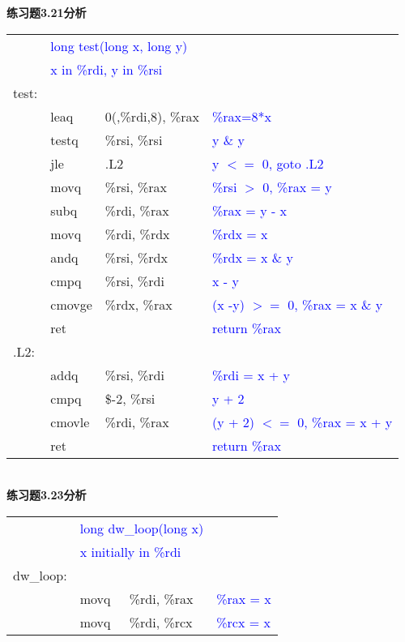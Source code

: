 \documentclass{article}
\newcommand{\blue}[1]{\textcolor{blue}{#1}}
\begin{document}
\begin{CJK}{UTF8}{gbsn}
\newpage
\textbf{练习题3.21分析}	\\
\begin{table}[ht]
\begin{tabular}{m{1em}m{3em}m{12em}l}
		&	\multicolumn{2}{l}{\blue{long test(long x, long y)}}	&	\\
		&	\multicolumn{2}{l}{\blue{x in \%rdi, y in \%rsi}}	&	\\
	test:	\\
	&	leaq	&	0(,\%rdi,8), \%rax				&	\blue{\%rax=8*x}	\\
	&	testq	&	\%rsi, \%rsi					&	\blue{y \& y}	\\
		&	jle	&	.L2					&	\blue{y $<=$ 0, goto .L2}\\
		&	movq	&	\%rsi, \%rax				&	\blue{\%rsi $>$ 0, \%rax = y}\\
		&	subq	&	\%rdi, \%rax				&	\blue{\%rax = y - x}\\
		&	movq	&	\%rdi, \%rdx				&	\blue{\%rdx = x}\\
		&	andq	&	\%rsi, \%rdx				&	\blue{\%rdx = x \& y}\\
		&	cmpq	&	\%rsi, \%rdi				&	\blue{x - y}	\\
		&	cmovge	&	\%rdx, \%rax				&	\blue{(x -y) $>=$ 0, \%rax = x \& y}	\\
		&	ret	&						&	\blue{return \%rax}	\\
	.L2:	\\
	&	addq	&	\%rsi, \%rdi					&	\blue{\%rdi = x + y}	\\
	&	cmpq	&	\$-2, \%rsi					&	\blue{y + 2}\\
	&	cmovle	&	\%rdi, \%rax					&	\blue{(y + 2) $<=$ 0, \%rax = x + y}	\\
	&	ret	&							&	\blue{return \%rax}	\\
\end{tabular}
\end{table}	\\
\textbf{练习题3.23分析}	\\
\begin{table}[ht]
\begin{tabular}{m{1em}m{3em}m{12em}l}
		&	\multicolumn{2}{l}{\blue{long dw\_loop(long x)}}	&	\\
		&	\multicolumn{2}{l}{\blue{x initially in \%rdi}}	&	\\
	dw\_loop:	\\
	&	movq	&	\%rdi, \%rax	&	\blue{\%rax = x}	\\
	&	movq	&	\%rdi, \%rcx	&	\blue{\%rcx = x}	\\

\end{tabular}
\end{table}
\end{CJK}
\end{document}
